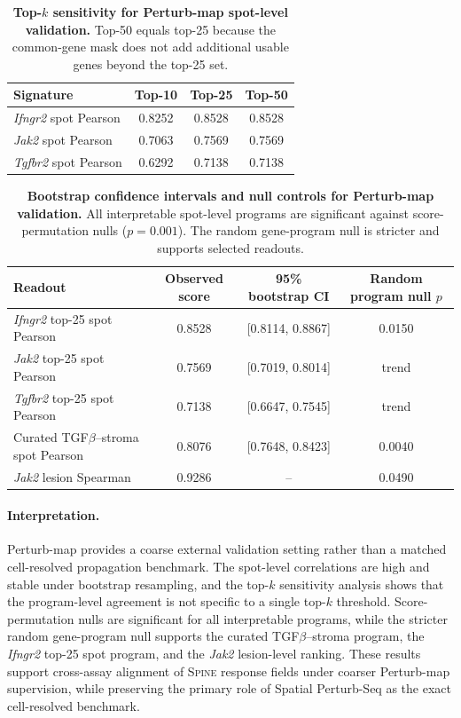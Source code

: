 \documentclass[sigconf,anonymous,review]{acmart}
\newcommand{\methodname}{\textsc{Spine}\xspace}
\begin{document}
\begin{table}[t]
\centering
\small
\setlength{\tabcolsep}{5pt}
\renewcommand{\arraystretch}{1.08}
\caption{\textbf{Top-$k$ sensitivity for Perturb-map spot-level validation.}
Top-50 equals top-25 because the common-gene mask does not add additional usable
genes beyond the top-25 set.}
\label{tab:perturbmap_topk}
\begin{tabular}{lccc}
\toprule
Signature & Top-10 & Top-25 & Top-50 \\
\midrule
\textit{Ifngr2} spot Pearson & 0.8252 & 0.8528 & 0.8528 \\
\textit{Jak2} spot Pearson & 0.7063 & 0.7569 & 0.7569 \\
\textit{Tgfbr2} spot Pearson & 0.6292 & 0.7138 & 0.7138 \\
\bottomrule
\end{tabular}
\end{table}

\begin{table}[t]
\centering
\small
\setlength{\tabcolsep}{5pt}
\renewcommand{\arraystretch}{1.08}
\caption{\textbf{Bootstrap confidence intervals and null controls for Perturb-map validation.}
All interpretable spot-level programs are significant against score-permutation nulls
($p=0.001$). The random gene-program null is stricter and supports selected readouts.}
\label{tab:perturbmap_null_ci}
\begin{tabular}{lccc}
\toprule
Readout & Observed score & 95\% bootstrap CI & Random program null $p$ \\
\midrule
\textit{Ifngr2} top-25 spot Pearson & 0.8528 & [0.8114, 0.8867] & 0.0150 \\
\textit{Jak2} top-25 spot Pearson & 0.7569 & [0.7019, 0.8014] & trend \\
\textit{Tgfbr2} top-25 spot Pearson & 0.7138 & [0.6647, 0.7545] & trend \\
Curated TGF$\beta$--stroma spot Pearson & 0.8076 & [0.7648, 0.8423] & 0.0040 \\
\textit{Jak2} lesion Spearman & 0.9286 & -- & 0.0490 \\
\bottomrule
\end{tabular}
\end{table}

\paragraph{Interpretation.}
Perturb-map provides a coarse external validation setting rather than a matched
cell-resolved propagation benchmark. The spot-level correlations are high and stable
under bootstrap resampling, and the top-$k$ sensitivity analysis shows that the
program-level agreement is not specific to a single top-$k$ threshold. Score-permutation
nulls are significant for all interpretable programs, while the stricter random
gene-program null supports the curated TGF$\beta$--stroma program, the \textit{Ifngr2}
top-25 spot program, and the \textit{Jak2} lesion-level ranking. These results support
cross-assay alignment of \methodname{} response fields under coarser Perturb-map
supervision, while preserving the primary role of Spatial Perturb-Seq as the exact
cell-resolved benchmark.
\end{document}
